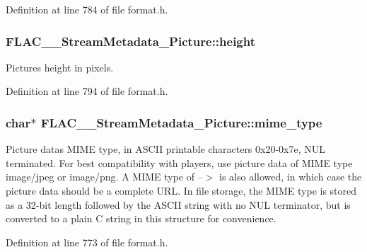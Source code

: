 Definition at line 784 of file format.\+h.

\subsubsection[{\texorpdfstring{height}{height}}]{ F\+L\+A\+C\+\_\+\+\_\+\+Stream\+Metadata\+\_\+\+Picture\+::height}\hypertarget{struct_f_l_a_c_____stream_metadata___picture_a76dbd1212d330807cda289660f5ee754}{}\label{struct_f_l_a_c_____stream_metadata___picture_a76dbd1212d330807cda289660f5ee754}
Picture\textquotesingle{}s height in pixels. 

Definition at line 794 of file format.\+h.

\subsubsection[{\texorpdfstring{mime\+\_\+type}{mime_type}}]{\setlength{\rightskip}{0pt plus 5cm}char$\ast$ F\+L\+A\+C\+\_\+\+\_\+\+Stream\+Metadata\+\_\+\+Picture\+::mime\+\_\+type}\hypertarget{struct_f_l_a_c_____stream_metadata___picture_a9b4af2e10b627c0e79abf4cdd79f80e0}{}\label{struct_f_l_a_c_____stream_metadata___picture_a9b4af2e10b627c0e79abf4cdd79f80e0}
Picture data\textquotesingle{}s M\+I\+ME type, in A\+S\+C\+II printable characters 0x20-\/0x7e, N\+UL terminated. For best compatibility with players, use picture data of M\+I\+ME type {\ttfamily image/jpeg} or {\ttfamily image/png}. A M\+I\+ME type of \textquotesingle{}--$>$\textquotesingle{} is also allowed, in which case the picture data should be a complete U\+RL. In file storage, the M\+I\+ME type is stored as a 32-\/bit length followed by the A\+S\+C\+II string with no N\+UL terminator, but is converted to a plain C string in this structure for convenience. 

Definition at line 773 of file format.\+h.

